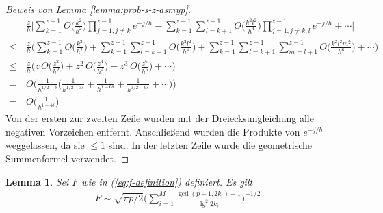 \documentclass[a4paper, 11pt, ngerman]{article}
\theoremstyle{definition}
\theoremstyle{plain}
\newtheorem{lemma}{Lemma}
\theoremstyle{remark}
\begin{document}
\begin{proof}[Beweis von Lemma \ref{lemma:prob-s-z-asmyp}]
    \begin{align*}
               & \frac z h \Bigg \vert
        \sum_{k = 1}^{z - 1} O \bigg ( \frac {k^2} {h^2} \bigg )
        \prod_{j = 1, j \ne k}^{z - 1} e^{-j/h}
        - \sum_{k = 1}^{z - 1}\sum_{l = k+1}^{z - 1}
        O \bigg ( \frac {k^2l^2} {h^4} \bigg )
        \prod_{j = 1, j \ne k,l}^{z - 1} e^{-j/h}
        + \cdots
        \Bigg \vert                                           \\
        \le \, & \frac z h \Bigg (
        \sum_{k = 1}^{z - 1} O \bigg ( \frac {k^2} {h^2} \bigg )
        + \sum_{k = 1}^{z - 1}\sum_{l = k+1}^{z - 1}
        O \bigg ( \frac {k^2l^2} {h^4} \bigg )
        + \sum_{k = 1}^{z - 1}\sum_{l = k+1}^{z - 1}\sum_{m = l + 1}^{z - 1}
        O \bigg ( \frac {k^2l^2m^2} {h^6} \bigg )
        + \cdots \Bigg )                                      \\
        \le \, & \frac z h \Bigg (
        z \, O \bigg ( \frac {z^2} {h^2} \bigg )
        + z^2 \, O \bigg ( \frac {z^4} {h^4} \bigg )
        + z^3 \, O \bigg ( \frac {z^6} {h^6} \bigg )
        + \cdots \Bigg )                                      \\
        = \,   & O \Bigg ( \frac 1 {h^{1/2 - \delta}} \bigg (
        \frac 1 {h^{1/2 - 3 \delta}} + \frac 1 {h^{1 - 6\delta}}
        + \frac 1 {h^{3/2 - 9\delta}} + \cdots
        \bigg ) \Bigg )                                       \\
        = \,   & O \bigg ( \frac 1 {h^{1 - 4\delta}} \bigg )
    \end{align*}
    Von der ersten zur zweiten Zeile wurden mit der Dreiecksungleichung alle negativen Vorzeichen entfernt. Anschließend wurden die Produkte von $e^{-j/h}$ weggelassen, da sie $\le 1$ sind. In der letzten Zeile wurde die geometrische Summenformel verwendet.
\end{proof}

\begin{lemma}
    Sei $F$ wie in (\ref{eq:f-definition}) definiert. Es gilt
    \begin{align*}
        F \sim \sqrt{\pi p / 2} \Bigg ( \sum_{i = 1}^M \frac {\gcd(p - 1, 2k_i) - 1} {\lg^2 2k_i} \Bigg )^{-1/2}
    \end{align*}

    \label{lemma:f-asmyp}
\end{lemma}
\end{document}

